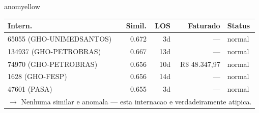 \documentclass[a4paper,10pt]{article}
\begin{document}
\begin{anomalycard}[Internacao 7431 | GHO-PETROBRAS | MODERADO (z=2.06)]{anomyellow}
\begin{tabular}{l r r r l}\toprule\textbf{Intern.} & \textbf{Simil.} & \textbf{LOS} & \textbf{Faturado} & \textbf{Status} \\\midrule
65055 (GHO-UNIMEDSANTOS) & 0.672 & 3d & --- & \textcolor{jcubeblue}{normal} \\
134937 (GHO-PETROBRAS) & 0.667 & 13d & --- & \textcolor{jcubeblue}{normal} \\
74970 (GHO-PETROBRAS) & 0.656 & 10d & R\$ 48.347,97 & \textcolor{jcubeblue}{normal} \\
1628 (GHO-FESP) & 0.656 & 14d & --- & \textcolor{jcubeblue}{normal} \\
47601 (PASA) & 0.655 & 3d & --- & \textcolor{jcubeblue}{normal} \\
\multicolumn{5}{l}{\textcolor{jcubeblue}{\small $\rightarrow$ Nenhuma similar e anomala --- esta internacao e verdadeiramente atipica.}} \\
\bottomrule\end{tabular}


\end{anomalycard}

\newpage
\end{document}

